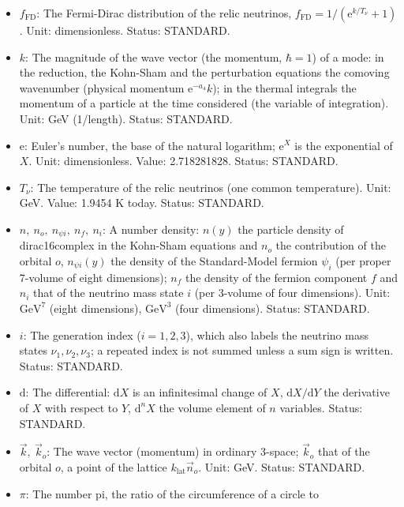 \documentclass[
  10pt,
]{article}
\providecommand{\tightlist}{%
  \setlength{\itemsep}{0pt}\setlength{\parskip}{0pt}}
\begin{document}
\begin{itemize}
\tightlist
\item
  \(f_{\mathrm{FD}}\): The Fermi-Dirac distribution of the relic
  neutrinos, \(f_{\mathrm{FD}} = 1/(\mathrm{e}^{k/T_\nu} + 1)\). Unit:
  dimensionless. Status: STANDARD.
\item
  \(k\): The magnitude of the wave vector (the momentum, \(\hbar = 1\))
  of a mode: in the reduction, the Kohn-Sham and the perturbation
  equations the comoving wavenumber (physical momentum
  \(\mathrm{e}^{-a_4}k\)); in the thermal integrals the momentum of a
  particle at the time considered (the variable of integration). Unit:
  GeV (1/length). Status: STANDARD.
\item
  \(\mathrm{e}\): Euler's number, the base of the natural logarithm;
  \(\mathrm{e}^{X}\) is the exponential of \(X\). Unit: dimensionless.
  Value: 2.718281828. Status: STANDARD.
\item
  \(T_\nu\): The temperature of the relic neutrinos (one common
  temperature). Unit: GeV. Value: 1.9454 K today. Status: STANDARD.
\item
  \(n,\ n_o,\ n_{\psi i},\ n_f,\ n_i\): A number density: \(n(y)\) the
  particle density of dirac16complex in the Kohn-Sham equations and
  \(n_o\) the contribution of the orbital \(o\), \(n_{\psi i}(y)\) the
  density of the Standard-Model fermion \(\psi_i\) (per proper 7-volume
  of eight dimensions); \(n_f\) the density of the fermion component
  \(f\) and \(n_i\) that of the neutrino mass state \(i\) (per 3-volume
  of four dimensions). Unit: \(\mathrm{GeV}^{7}\) (eight dimensions),
  \(\mathrm{GeV}^{3}\) (four dimensions). Status: STANDARD.
\item
  \(i\): The generation index (\(i = 1, 2, 3\)), which also labels the
  neutrino mass states \(\nu_1, \nu_2, \nu_3\); a repeated index is not
  summed unless a sum sign is written. Status: STANDARD.
\item
  \(\mathrm{d}\): The differential: \(\mathrm{d}X\) is an infinitesimal
  change of \(X\), \(\mathrm{d}X/\mathrm{d}Y\) the derivative of \(X\)
  with respect to \(Y\), \(\mathrm{d}^nX\) the volume element of \(n\)
  variables. Status: STANDARD.
\item
  \(\vec k,\ \vec k_o\): The wave vector (momentum) in ordinary 3-space;
  \(\vec k_o\) that of the orbital \(o\), a point of the lattice
  \(k_{\mathrm{lat}}\vec n_o\). Unit: GeV. Status: STANDARD.
\item
  \(\pi\): The number pi, the ratio of the circumference of a circle to

\end{itemize}
\end{document}
